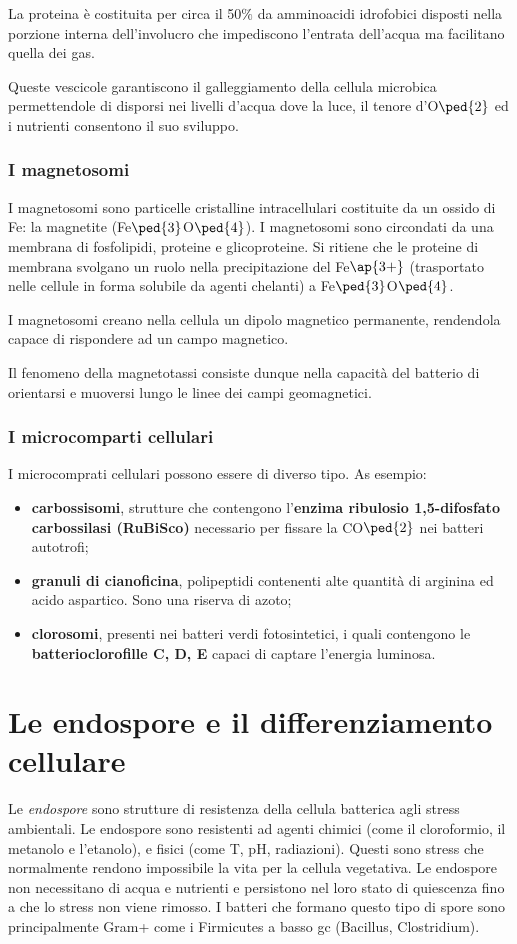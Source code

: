 \documentclass[11pt]{book}
\begin{document}
La proteina è costituita per circa il 50$\%$ da amminoacidi idrofobici disposti nella porzione interna dell’involucro che impediscono l’entrata dell’acqua ma facilitano quella dei gas.

Queste vescicole garantiscono il galleggiamento della cellula microbica permettendole di disporsi nei livelli d’acqua dove la luce, il tenore d’O$\ped{2}$ ed i nutrienti consentono il suo sviluppo.

\subsection{I magnetosomi}
I magnetosomi sono particelle cristalline intracellulari costituite da un ossido di Fe: la magnetite (Fe$\ped{3}$O$\ped{4}$). I magnetosomi sono circondati da una membrana di fosfolipidi, proteine e glicoproteine. Si ritiene che le proteine di membrana svolgano un ruolo nella
precipitazione del Fe$\ap{3+}$ (trasportato nelle cellule in forma solubile da agenti chelanti) a Fe$\ped{3}$O$\ped{4}$.

I magnetosomi creano nella cellula un dipolo magnetico permanente, rendendola capace di rispondere ad un campo magnetico.

\vspace{1em}
Il fenomeno della magnetotassi consiste dunque nella capacità del batterio di orientarsi e muoversi lungo le linee dei campi geomagnetici. 


\subsection{I microcomparti cellulari}
I microcomprati cellulari possono essere di diverso tipo. As esempio:
\begin{itemize}
\item \textbf{carbossisomi}, strutture che contengono l’\textbf{enzima ribulosio 1,5-difosfato carbossilasi (RuBiSco)} necessario per fissare la CO$\ped{2}$ nei batteri autotrofi;
\item \textbf{granuli di cianoficina}, polipeptidi contenenti alte quantità di arginina ed acido aspartico. Sono una riserva di azoto;
\item \textbf{clorosomi}, presenti nei batteri verdi fotosintetici, i quali contengono le \textbf{batterioclorofille C, D, E} capaci di captare l’energia luminosa.
\end{itemize}

\clearpage
\chapter{Le endospore e il differenziamento cellulare}
Le \emph{endospore} sono strutture di resistenza della cellula batterica agli stress ambientali. Le endospore sono resistenti ad agenti chimici (come il cloroformio, il metanolo e l'etanolo), e fisici (come T, pH, radiazioni).
Questi sono stress che normalmente rendono impossibile la vita per la cellula vegetativa. Le endospore non necessitano di acqua e nutrienti e persistono nel loro stato di quiescenza fino a che lo stress non viene rimosso. I batteri che formano questo tipo di spore sono principalmente Gram+ come i Firmicutes a basso gc (Bacillus, Clostridium).
\end{document}
